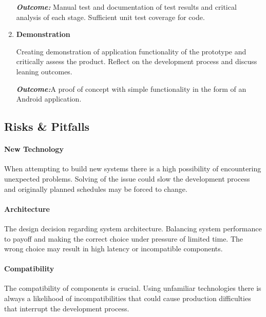 \documentclass[a4paper, 11pt]{article}
\begin{document}
\begin{enumerate}
\begin{flushleft}
	\emph{\textbf{Outcome:}} Manual test and documentation of test results and critical analysis of each stage. Sufficient unit test coverage for code.
	\vspace{\baselineskip}
  	\end{flushleft}
	   \item \textbf{Demonstration}
   	\begin{flushleft}Creating demonstration of application functionality of the prototype and critically assess the product. Reflect on the development process and discuss leaning outcomes. 
	
	\emph{\textbf{Outcome:}}A proof of concept with simple functionality in the form of an Android application.
	  	\end{flushleft}
\end{enumerate}
\vspace{\baselineskip}


\vspace{\baselineskip}
\vspace{\baselineskip}
\vspace{\baselineskip}

\subsection{Risks \& Pitfalls}
\paragraph{New Technology}When attempting to build new systems there is a high possibility of encountering unexpected problems. Solving of the issue could slow the development process and originally planned schedules may be forced to change. 

\paragraph{Architecture}The design decision regarding system architecture. Balancing system performance to payoff and making the correct choice under pressure of limited time. The wrong choice may result in high latency or incompatible components.   

\paragraph{Compatibility}The compatibility of components is crucial. Using unfamiliar technologies there is always a likelihood of incompatibilities that could cause production difficulties that interrupt the development process. 
\end{document}

